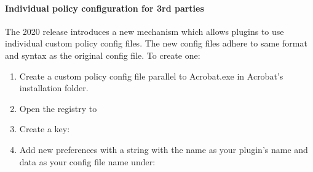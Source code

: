 \documentclass[letterpaper,12pt,english,openany,oneside]{sphinxmanual}
\begin{document}
\paragraph{Individual policy configuration for 3rd parties}
\label{\detokenize{SandboxBrokerExt:individual-policy-configuration-for-3rd-parties}}
The 2020 release introduces a new mechanism which allows plugins to use individual custom policy config files. The new config files adhere to same format and syntax as the original config file. To create one:
\begin{enumerate}
%
\item {} 
Create a custom policy config file parallel to Acrobat.exe in Acrobat’s installation folder.

\item {} 
Open the registry to 

\item {} 
Create a key: 

\item {} 
Add new preferences with a string with the name as your plugin’s name and data as your config file name under:

\end{enumerate}
\end{document}
